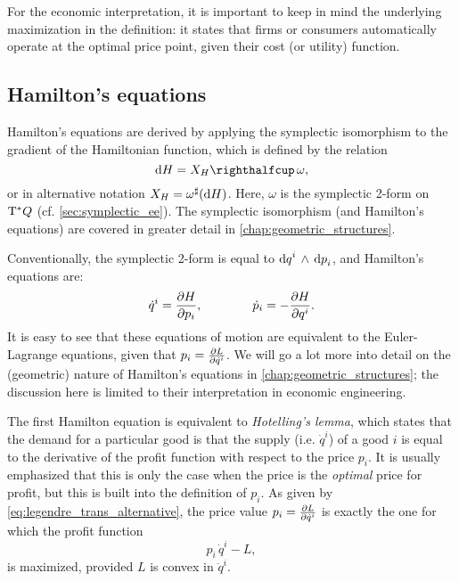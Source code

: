 For the economic interpretation, it is important to keep in mind the underlying maximization in the definition: it states that firms or consumers automatically operate at the optimal price point, given their cost (or utility) function.

\subsection{Hamilton's equations} 
Hamilton's equations are derived by applying the symplectic isomorphism to the gradient of the Hamiltonian function, which is defined by the relation
\begin{equation}
    \dd{H} = \intpr{X_H}{\omega},
\end{equation}
or in alternative notation \(X_H = \omega^\sharp(\dd{H})\). Here, $\omega$ is the symplectic 2-form on $\mathrm{T}^*Q$ (cf. \cref{sec:symplectic_ee}). The symplectic isomorphism (and Hamilton's equations) are covered in greater detail in \cref{chap:geometric_structures}.

Conventionally, the symplectic 2-form is equal to $ \dd{q}^i\,\wedge\,\dd{p}_i $, and Hamilton's equations are:
\begin{equation}
    \dot{q}^i = \pdv{H}{p_i}, \qquad \qquad \dot{p}_i = -\pdv{H}{q^i}.
    \label{eq:legendre_trans_alternative}
\end{equation}
It is easy to see that these equations of motion are equivalent to the Euler-Lagrange equations, given that \(p_i = \pdv{L}{\dot{q}^i}\). We will go a lot more into detail on the (geometric) nature of Hamilton's equations in \cref{chap:geometric_structures}; the discussion here is limited to their interpretation in economic engineering.

The first Hamilton equation is equivalent to \emph{Hotelling's lemma}, which states that the demand for a particular good is that the supply (i.e. \(\dot{q}^i\)) of a good \(i\) is equal to the derivative of the profit function with respect to the price \(p_i\). It is usually emphasized that this is only the case when the price is the \emph{optimal} price for profit, but this is built into the definition of \(p_i\). As given by \cref{eq:legendre_trans_alternative}, the price value \(p_i = \pdv{L}{\dot{q}^i}\) is exactly the one for which the profit function
\begin{equation}
     p_i\,\dot{q}^i - L,
\end{equation}
is maximized, provided \(L\) is convex in \(\dot{q}^i\). 

